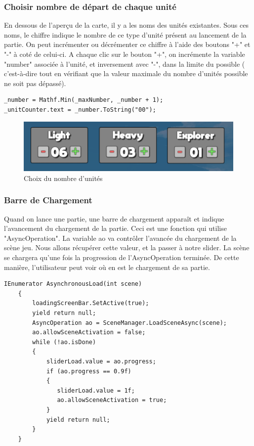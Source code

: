 \documentclass{report}
\begin{document}
\subsubsection{Choisir nombre de départ de chaque unité}
En dessous de l’aperçu de la carte, il y a les noms des unités existantes. Sous ces noms, le chiffre indique le nombre de ce type d'unité présent au lancement de la partie. On peut incrémenter ou décrémenter ce chiffre à l'aide des boutons "+" et "-" à coté de celui-ci. A chaque clic sur le bouton "+", on incrémente la variable "number" associée à l'unité, et inversement avec "-", dans la limite du possible ( c'est-à-dire tout en vérifiant que la valeur maximale du nombre d'unités possible ne soit pas dépassé).

\begin{lstlisting}[language={[Sharp]C},label={lst:Add()}, caption= Extrait du code de UnitSettingMenu.cs]
_number = Mathf.Min(_maxNumber, _number + 1);
_unitCounter.text = _number.ToString("00");
\end{lstlisting}

\begin{figure}[!h]
	\centering
		\includegraphics[scale=0.80]{NumberUnits}
	\caption{Choix du nombre d'unités}
\end{figure}

\subsubsection{Barre de Chargement}
Quand on lance une partie, une barre de chargement apparaît et indique l'avancement du chargement de la partie.
Ceci est une fonction qui utilise "AsyncOperation". La variable ao va contrôler l'avancée du chargement de la scène jeu.
Nous allons récupérer cette valeur, et la passer à notre slider.
La scène se chargera qu'une fois la progression de l'AsyncOperation terminée.
De cette manière, l'utilisateur peut voir où en est le chargement de sa partie.

\begin{lstlisting}[language={[Sharp]C},label={lst:Add()}, caption= Extrait du code de UnitSettingMenu.cs]
IEnumerator AsynchronousLoad(int scene)
    {
        loadingScreenBar.SetActive(true);
        yield return null;
        AsyncOperation ao = SceneManager.LoadSceneAsync(scene);
        ao.allowSceneActivation = false;
        while (!ao.isDone)
        {
            sliderLoad.value = ao.progress;
            if (ao.progress == 0.9f)
            { 
               sliderLoad.value = 1f;
               ao.allowSceneActivation = true;
            }
            yield return null;
        }
    }
\end{lstlisting}
\end{document}
